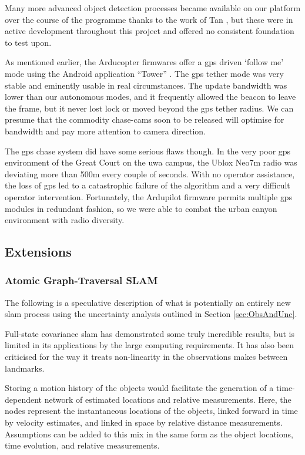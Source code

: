 \documentclass[a4paper, 11pt, titlepage]{article}
\newcounter{subsubsubsection}[subsubsection]
\begin{document}
        Many more advanced object detection processes became available on our platform over the course of the programme thanks to the work of Tan \cite{Tan}, but these were in active development throughout this project and offered no consistent foundation to test upon.

        As mentioned earlier, the Arducopter firmwares offer a \gls{gps} driven `follow me' mode using the Android application ``Tower'' \cite{3dr-tower}.
        The \gls{gps} tether mode was very stable and eminently usable in real circumstances.  The update bandwidth was lower than our autonomous modes, and it frequently allowed the beacon to leave the frame, but it never lost lock or moved beyond the \gls{gps} tether radius.  We can presume that the commodity chase-cams soon to be released will optimise for bandwidth and pay more attention to camera direction.

        The \gls{gps} chase system did have some serious flaws though.  In the very poor \gls{gps} environment of the Great Court on the \gls{uwa} campus, the Ublox Neo7m radio was deviating more than 500m every couple of seconds.  With no operator assistance, the loss of \gls{gps} led to a catastrophic failure of the algorithm and a very difficult operator intervention.  Fortunately, the Ardupilot firmware permits multiple \gls{gps} modules in redundant fashion, so we were able to combat the urban canyon environment with radio diversity.

    \subsection{Extensions}

      \subsubsection{Atomic Graph-Traversal SLAM}
      \label{sec:SLAMproposal}
        The following is a speculative description of what is potentially an entirely new \gls{slam} process using the uncertainty analysis outlined in Section \ref{sec:ObsAndUnc}.

        Full-state covariance \gls{slam} has demonstrated some truly incredible results, but is limited in its applications by the large computing requirements.  It has also been criticised for the way it treats non-linearity in the observations makes between landmarks.

        Storing a motion history of the objects would facilitate the generation of a time-dependent network of estimated locations and relative measurements.
        Here, the nodes represent the instantaneous locations of the objects, linked forward in time by velocity estimates, and linked in space by relative distance measurements.  Assumptions can be added to this mix in the same form as the object locations, time evolution, and relative measurements.
\end{document}
